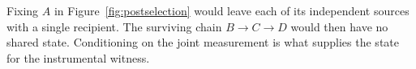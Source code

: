 Fixing \(A\) in Figure~\ref{fig:postselection} would leave each of its
independent sources with a single recipient. The surviving chain
\(B\to C\to D\) would then have no shared state. Conditioning on the
joint measurement is what supplies the state for the instrumental witness.
